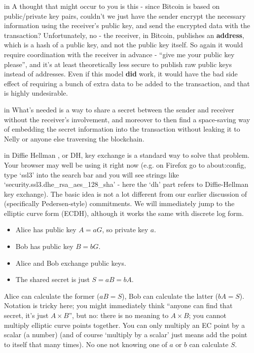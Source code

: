 \documentclass[10pt,a4paper]{article}
\begin{document}
 in \noindent A thought that might occur to you is this - since Bitcoin is based on public/private key pairs, couldn't we just have the sender encrypt the necessary information using the receiver's public key, and send the encrypted data with the transaction? Unfortunately, no - the receiver, in Bitcoin, publishes an \textbf{address}, which is a hash of a public key, and not the public key itself. So again it would require coordination with the receiver in advance - ``give me your public key please'', and it's at least theoretically less secure to publish raw public keys instead of addresses. Even if this model \textbf{did} work, it would have the bad side effect of requiring a bunch of extra data to be added to the transaction, and that is highly undesirable.

 in \noindent What's needed is a way to share a secret between the sender and receiver without the receiver's involvement, and moreover to then find a space-saving way of embedding the secret information into the transaction without leaking it to Nelly or anyone else traversing the blockchain.

 in \noindent Diffie Hellman \cite{dhke}, or DH, key exchange is a standard way to solve that problem. Your browser may well be using it right now (e.g. on Firefox go to about:config, type `ssl3' into the search bar and you will see strings like `security.ssl3.dhe\_rsa\_aes\_128\_sha' - here the `dh' part refers to Diffie-Hellman key exchange). The basic idea is not a lot different from our earlier discussion of (specifically Pedersen-style) commitments. We will immediately jump to the elliptic curve form (ECDH), although it works the same with discrete log form.

\begin{itemize}
\item Alice has public key $A = aG$, so private key $a$.
\item Bob has public key $B = bG$.
\item Alice and Bob exchange public keys.
\item The shared secret is just $S = aB = bA$.
\end{itemize}

Alice can calculate the former ($aB = S$), Bob can calculate the latter ($bA = S$). Notation is tricky here; you might immediately think ``anyone can find that secret, it's just $A \times B$'', but no: there is no meaning to $A \times B$; you cannot multiply elliptic curve points together. You can only multiply an EC point by a scalar (a number) (and of course `multiply by a scalar' just means add the point to itself that many times). No one not knowing one of $a$ or $b$ can calculate $S$.
\end{document}
